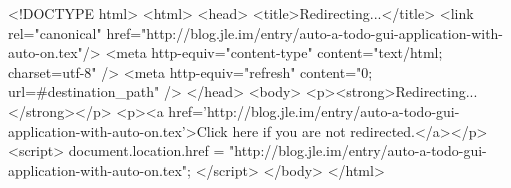 <!DOCTYPE html>
<html>
<head>
<title>Redirecting...</title>
<link rel="canonical" href="http://blog.jle.im/entry/auto-a-todo-gui-application-with-auto-on.tex"/>
<meta http-equiv="content-type" content="text/html; charset=utf-8" />
<meta http-equiv="refresh" content="0; url=#{destination_path}" />
</head>
<body>
  <p><strong>Redirecting...</strong></p>
  <p><a href='http://blog.jle.im/entry/auto-a-todo-gui-application-with-auto-on.tex'>Click here if you are not redirected.</a></p>
  <script>
    document.location.href = "http://blog.jle.im/entry/auto-a-todo-gui-application-with-auto-on.tex";
  </script>
</body>
</html>
